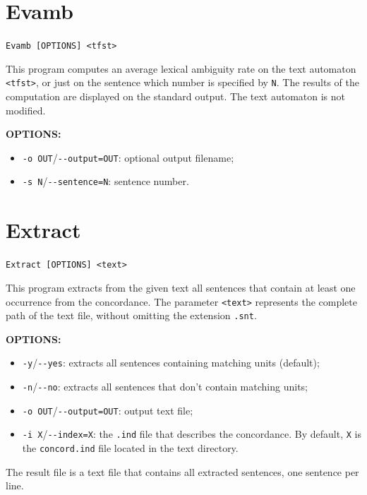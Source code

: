 \section{Evamb}
\verb+Evamb [OPTIONS] <tfst>+

\bigskip
\noindent This program computes an average lexical ambiguity rate on the text
automaton \verb+<tfst>+, or just on the sentence which number is specified by
\verb+N+. The results of the computation are displayed on the standard output.
The text automaton is not modified.

\bigskip
\noindent \textbf{OPTIONS:}
\begin{itemize}
  \item \verb+-o OUT+/\verb+--output=OUT+: optional output filename;
  \item \verb+-s N+/\verb+--sentence=N+: sentence number.
\end{itemize}








\section{Extract}
\verb+Extract [OPTIONS] <text>+

\bigskip
\noindent This program extracts from the given text all sentences that
contain at least one occurrence from the concordance. The parameter
\verb+<text>+ represents the complete path of the text file, without 
omitting the extension \verb+.snt+.

\bigskip
\noindent \textbf{OPTIONS:}
\begin{itemize}
  \item \verb+-y+/\verb+--yes+: extracts all sentences containing matching units
  (default);
  \item \verb+-n+/\verb+--no+: extracts all sentences that don't contain
  matching units;
  \item \verb+-o OUT+/\verb+--output=OUT+: output text file;
  \item \verb+-i X+/\verb+--index=X+: the \verb+.ind+ file that describes the
        concordance. By default, \verb+X+ is the \verb+concord.ind+ file located
        in the text directory.
\end{itemize}

\bigskip
\noindent The result file is a text file that contains all extracted sentences, one
sentence per line.







